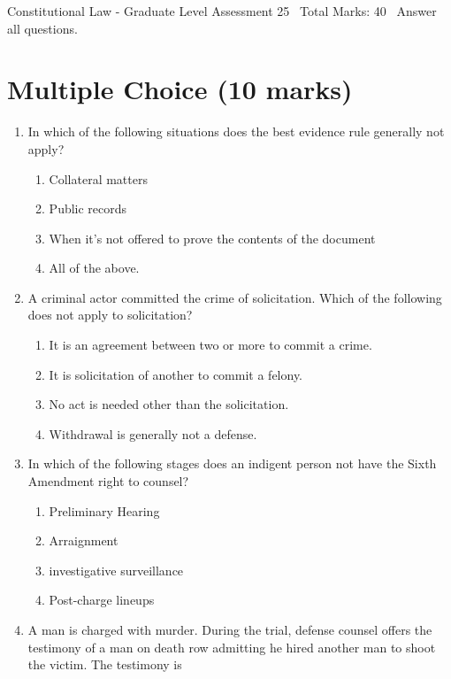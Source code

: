 \documentclass[12pt]{article}
\begin{document}
\begin{center}
Constitutional Law - Graduate Level Assessment 25 \
Total Marks: 40 \
Answer all questions.
\end{center}

\section*{Multiple Choice (10 marks)}
\begin{enumerate}[label=\arabic*.]
\item In which of the following situations does the best evidence rule generally not apply?
\begin{enumerate}[label=(\alph*)]
    \item Collateral matters
    \item Public records
    \item When it's not offered to prove the contents of the document
    \item All of the above.
\end{enumerate}
\item A criminal actor committed the crime of solicitation. Which of the following does not apply to solicitation?
\begin{enumerate}[label=(\alph*)]
    \item It is an agreement between two or more to commit a crime.
    \item It is solicitation of another to commit a felony.
    \item No act is needed other than the solicitation.
    \item Withdrawal is generally not a defense.
\end{enumerate}
\item In which of the following stages does an indigent person not have the Sixth Amendment right to counsel?
\begin{enumerate}[label=(\alph*)]
    \item Preliminary Hearing
    \item Arraignment
    \item investigative surveillance
    \item Post-charge lineups
\end{enumerate}
\item A man is charged with murder. During the trial, defense counsel offers the testimony of a man on death row admitting he hired another man to shoot the victim. The testimony is
\begin{enumerate}[label=(\alph*)]

\end{enumerate}
\end{enumerate}
\end{document}
